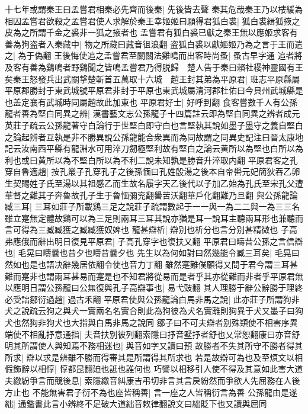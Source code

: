 十七年或謂秦王曰孟嘗君相秦必先齊而後秦|{
	先後皆去聲}
秦其危哉秦王乃以樓緩為相囚孟嘗君欲殺之孟嘗君使人求解於秦王幸姬姬曰願得君狐白裘|{
	狐白裘緝狐掖之皮為之所謂千金之裘非一狐之掖者也}
孟嘗君有狐白裘已獻之秦王無以應姬求客有善為狗盗者入秦藏中|{
	物之所藏曰藏音徂浪翻}
盗狐白裘以獻姬姬乃為之言于王而遣之|{
	為于偽翻}
王後悔使追之孟嘗君至關關法雞鳴而出客時尚蚤|{
	蚤古早字通}
追者將及客有善為鷄鳴者野鷄聞之皆鳴孟嘗君乃得脱歸　楚人告于秦曰賴社稷神靈國有王矣秦王怒發兵出武關撃楚斬首五萬取十六城　趙王封其弟為平原君|{
	班志平原縣屬平原郡勝封于東武城號平原君非封于平原也東武城屬清河郡杜佑曰今貝州武城縣是也盖定襄有武城時同屬趙故此加東也}
平原君好士|{
	好呼到翻}
食客嘗數千人有公孫龍者善為堅白同異之辨|{
	漢書藝文志公孫龍子十四篇註云即為堅白同異之辨者成元英莊子疏云公孫龍著守白論行于世堅白即守白也言堅執其說如墨子墨守之義自堅白之論起辨者互執是非不勝異說公孫龍能合衆異而為同故謂之同異史記注曰晉太康地記云汝南西平縣有龍淵水可用淬刀劒極堅利故有堅白之論云黄所以為堅也白所以為利也或曰黄所以為不堅白所以為不利二說未知孰是勝音升淬取内翻}
平原君客之孔穿自魯適趙|{
	按孔叢子孔穿孔子之後孫愐曰孔姓殷湯之後本自帝嚳元妃簡狄吞乙卵生契賜姓子氏至湯以其祖感乙而生故名履字天乙後代以子加乙始為孔氏至宋孔父遭華督之難其子奔魯故孔子生于魯愐彌兖翻嚳苦沃翻華戶化翻難乃旦翻}
與公孫龍論臧三耳|{
	三耳如莊子所載鷄三足之說莊子疏謂數起于一一與一為二二與一為三三名雖立寔無定體故鷄可以為三足則兩耳三耳其說亦猶是耳一說耳主聽兩耳形也兼聽而言可得為三臧臧獲之臧臧獲奴婢也}
龍甚辯析|{
	辯别也析分也言分别甚精微也}
子高弗應俄而辭出明日復見平原君|{
	子高孔穿字也復扶又翻}
平原君曰疇昔公孫之言信辯也|{
	毛晃曰疇曩也昔夕也疇昔曩夕也}
先生以為何如對曰然幾能令臧三耳矣|{
	毛晃曰然如也是也語决辭幾居依翻令使也音力丁翻}
雖然寔難僕願得又問于君今謂三耳甚難而寔非也謂兩耳甚易而寔是也不知君將從易而是者乎其亦從難而非者乎平原君無以應明日謂公孫龍曰公無復與孔子高辯事也|{
	易弋豉翻}
其人理勝于辭公辭勝于理終必受詘鄒衍過趙|{
	過古禾翻}
平原君使與公孫龍論白馬非馬之說|{
	此亦莊子所謂狗非犬之說疏云狗之與犬一實兩名名實合則此為狗彼為犬名實離則狗異于犬又墨子曰狗犬也然狗非狗犬也大指與白馬非馬之說同}
鄒子曰不可夫辯者别殊類使不相害序異端使不相亂抒意通指|{
	夫音扶别彼列翻索隱曰抒音墅抒者舒也乂常恕翻康曰亦音舒}
明其所謂使人與知焉不務相迷也|{
	與音如字又讀曰預}
故勝者不失其所守不勝者得其所求|{
	辯以求是辨雖不勝而得審其是所謂得其所求也}
若是故辯可為也及至煩文以相假飾辭以相惇|{
	惇都昆翻廹也詆也誰何也}
巧譬以相移引人使不得及其意如此害大道夫繳紛爭言而競後息|{
	索隱繳音糾康吉弔切非言其言戾紛然而爭欲人先屈務在人後方止也}
不能無害君子衍不為也座皆稱善|{
	言一座之人皆稱衍言為善}
公孫龍由是遂絀|{
	通鑑書此言小辨終不足破大道絀音敕律翻說文曰絀貶下也又讀與屈同}


